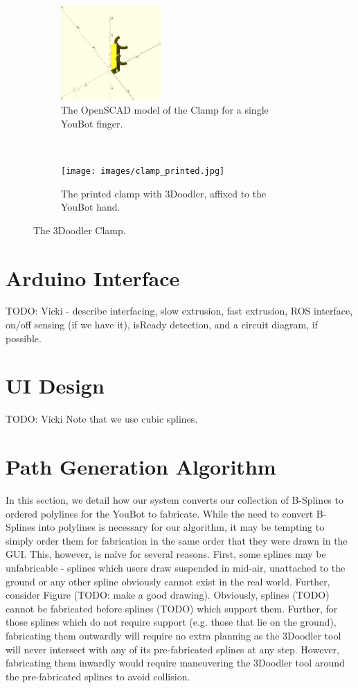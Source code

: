 \documentclass[conference]{acmsiggraph}
\begin{document}
\begin{figure}[t!]
\centering

\begin{subfigure}[t]{1.5in}
\centering
\includegraphics[width=1.5in]{images/clamp.png}
\caption{The OpenSCAD model of the Clamp for a single YouBot finger.}
\label{fig:halfclamp}
\end{subfigure}
~
\begin{subfigure}[t]{1.5in}
\centering
\texttt{[image: images/clamp\_printed.jpg]}
\caption{The printed clamp with 3Doodler, affixed to the YouBot hand.}
\label{fig:printedclamp}
\end{subfigure}
\caption{The 3Doodler Clamp.}
\end{figure}




\section{Arduino Interface}
TODO: Vicki - describe interfacing, slow extrusion, fast extrusion, ROS interface, on/off sensing (if we have it), isReady detection, and a circuit diagram, if possible.


\section{UI Design}
TODO: Vicki
Note that we use cubic splines.

\section{Path Generation Algorithm}
In this section, we detail how our system converts our collection of B-Splines to ordered polylines for the YouBot to fabricate.  While the need to convert B-Splines into polylines is necessary for our algorithm, it may be tempting to simply order them for fabrication in the same order that they were drawn in the GUI.  This, however, is naïve for several reasons.  First, some splines may be unfabricable - splines which users draw suspended in mid-air, unattached to the ground or any other spline obviously cannot exist in the real world.  Further, consider Figure (TODO: make a good drawing).  Obviously, splines (TODO) cannot be fabricated before splines (TODO) which support them.  Further, for those splines which do not require support (e.g. those that lie on the ground), fabricating them outwardly will require no extra planning as the 3Doodler tool will never intersect with any of its pre-fabricated splines at any step.  However, fabricating them inwardly would require maneuvering the 3Doodler tool around the pre-fabricated splines to avoid collision.
\end{document}
